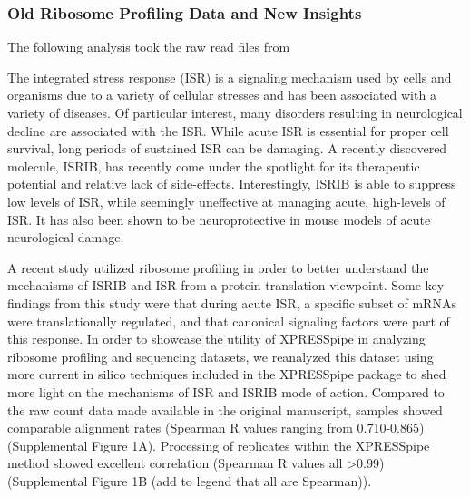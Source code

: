 \documentclass[11pt, a4paper, oneside]{article}
\begin{document}
\subsubsection{Old Ribosome Profiling Data and New Insights}
The following analysis took the raw read files from 

The integrated stress response (ISR) is a signaling mechanism used by cells and organisms due to a variety of cellular stresses and has been associated with a variety of diseases. Of particular interest, many disorders resulting in neurological decline are associated with the ISR.  While acute ISR is essential for proper cell survival, long periods of sustained ISR can be damaging. A recently discovered molecule, ISRIB, has recently come under the spotlight for its therapeutic potential and relative lack of side-effects. Interestingly, ISRIB is able to suppress low levels of ISR, while seemingly uneffective at managing acute, high-levels of ISR. It has also been shown to be neuroprotective in mouse models of acute neurological damage.

A recent study utilized ribosome profiling in order to better understand the mechanisms of ISRIB and ISR from a protein translation viewpoint. Some key findings from this study were that during acute ISR, a specific subset of mRNAs were translationally regulated, and that canonical signaling factors were part of this response. In order to showcase the utility of XPRESSpipe in analyzing ribosome profiling and sequencing datasets, we reanalyzed this dataset using more current in silico techniques included in the XPRESSpipe package to shed more light on the mechanisms of ISR and ISRIB mode of action. Compared to the raw count data made available in the original manuscript, samples showed comparable alignment rates (Spearman R values ranging from 0.710-0.865) (Supplemental Figure 1A). Processing of replicates within the XPRESSpipe method showed excellent correlation (Spearman R values all \textgreater 0.99)  (Supplemental Figure 1B (add to legend that all are Spearman)).
\end{document}
